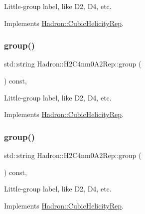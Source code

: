 Little-\/group label, like D2, D4, etc. 

Implements \mbox{\hyperlink{structHadron_1_1CubicHelicityRep_a101a7d76cd8ccdad0f272db44b766113}{Hadron\+::\+Cubic\+Helicity\+Rep}}.

\mbox{\label{structHadron_1_1H2C4nm0A2Rep_a91188ca54be99a0d11ac82323d7637ce}} 
\subsubsection{\texorpdfstring{group()}{group()}\hspace{0.1cm}{\footnotesize\ttfamily [2/3]}}
{\footnotesize\ttfamily std\+::string Hadron\+::\+H2\+C4nm0\+A2\+Rep\+::group (\begin{DoxyParamCaption}{ }\end{DoxyParamCaption}) const\hspace{0.3cm}{\ttfamily [inline]}, {\ttfamily [virtual]}}

Little-\/group label, like D2, D4, etc. 

Implements \mbox{\hyperlink{structHadron_1_1CubicHelicityRep_a101a7d76cd8ccdad0f272db44b766113}{Hadron\+::\+Cubic\+Helicity\+Rep}}.

\mbox{\label{structHadron_1_1H2C4nm0A2Rep_a91188ca54be99a0d11ac82323d7637ce}} 
\subsubsection{\texorpdfstring{group()}{group()}\hspace{0.1cm}{\footnotesize\ttfamily [3/3]}}
{\footnotesize\ttfamily std\+::string Hadron\+::\+H2\+C4nm0\+A2\+Rep\+::group (\begin{DoxyParamCaption}{ }\end{DoxyParamCaption}) const\hspace{0.3cm}{\ttfamily [inline]}, {\ttfamily [virtual]}}

Little-\/group label, like D2, D4, etc. 

Implements \mbox{\hyperlink{structHadron_1_1CubicHelicityRep_a101a7d76cd8ccdad0f272db44b766113}{Hadron\+::\+Cubic\+Helicity\+Rep}}.

